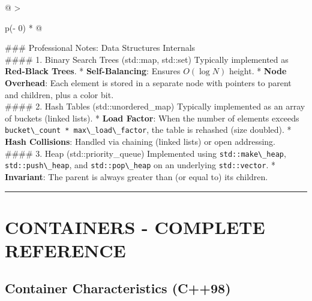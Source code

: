 \begin{longtable}[]{@{}
  >{\raggedright\arraybackslash}p{(\columnwidth - 0\tabcolsep) * }@{}}
\toprule
\endhead
\#\#\# Professional Notes: Data Structures Internals \\
\#\#\#\# 1. Binary Search Trees (std::map, std::set) Typically
implemented as \textbf{Red-Black Trees}. * \textbf{Self-Balancing}:
Ensures \(O(\log N)\) height. * \textbf{Node Overhead}: Each element is
stored in a separate node with pointers to parent and children, plus a
color bit. \\
\#\#\#\# 2. Hash Tables (std::unordered\_map) Typically implemented as
an array of buckets (linked lists). * \textbf{Load Factor}: When the
number of elements exceeds
\passthrough{\lstinline!bucket\_count * max\_load\_factor!}, the table
is rehashed (size doubled). * \textbf{Hash Collisions}: Handled via
chaining (linked lists) or open addressing. \\
\#\#\#\# 3. Heap (std::priority\_queue) Implemented using
\passthrough{\lstinline!std::make\_heap!},
\passthrough{\lstinline!std::push\_heap!}, and
\passthrough{\lstinline!std::pop\_heap!} on an underlying
\passthrough{\lstinline!std::vector!}. * \textbf{Invariant}: The parent
is always greater than (or equal to) its children. \\
\bottomrule
\end{longtable}

\begin{center}\rule{0.5\linewidth}{0.5pt}\end{center}

\hypertarget{containers---complete-reference}{%
\section{CONTAINERS - COMPLETE
REFERENCE}\label{containers---complete-reference}}

\hypertarget{container-characteristics-c98}{%
\subsection{Container Characteristics
(C++98)}\label{container-characteristics-c98}}

